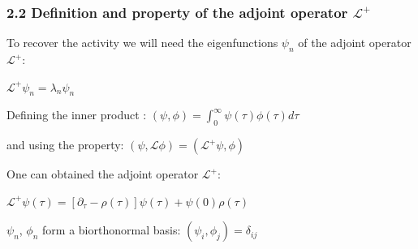 \documentclass{beamer}
\begin{document}
\begin{frame}
\frametitle{2.2 Definition and property of the adjoint operator $\mathcal{L}^+$}

To recover the activity we will need the eigenfunctions $\psi_n$ of the adjoint operator $\mathcal{L}^+$:

\hspace{3.8cm}
$\mathcal{L}^+\psi_n=\lambda_n\psi_n$

\pause
\vspace{0.5cm}
Defining the inner product : $(\psi,\phi)=\int_{0}^{\infty}\psi(\tau)\phi(\tau)d\tau$

\vspace{0.5cm} and using the property: $(\psi,\mathcal{L}\phi)  = (\mathcal{L}^+\psi,\phi)$

\pause
\vspace{0.5cm} 
One can obtained the adjoint operator $\mathcal{L}^+$:


\vspace{0.2cm} 
\hspace{2cm}$
\mathcal{L}^+\psi(\tau)=[\partial_{\tau}-\rho(\tau)]\psi(\tau)+\psi(0)\rho(\tau)
$

\pause
\vspace{0.5cm} 
$\psi_n$, $\phi_n$ form a biorthonormal basis:
\vspace{0.3cm}
\hspace{3.8cm}
$
(\psi_i,\phi_j)=\delta_{ij}
$
\end{frame}
\end{document}

